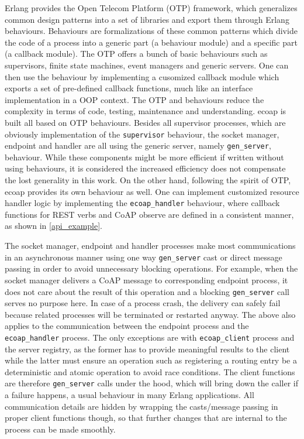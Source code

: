 Erlang provides the Open Telecom Platform (OTP) framework, which generalizes common design patterns into a set of libraries and export them through Erlang behaviours. Behaviours are formalizations of these common patterns which divide the code of a process into a generic part (a behaviour module) and a specific part (a callback module). The OTP offers a bunch of basic behaviours such as supervisors, finite state machines, event managers and generic servers. One can then use the behaviour by implementing a cusomized callback module which exports a set of pre-defined callback functions, much like an interface implementation in a OOP context. The OTP and behaviours reduce the complexity in terms of code, testing, maintenance and understanding. ecoap is built all based on OTP behaviours. Besides all supervisor processes, which are obviously implementation of the \verb|supervisor| behaviour, the socket manager, endpoint and handler are all using the generic server, namely \verb|gen_server|, behaviour. While these components might be more efficient if written without using behaviours, it is considered the increased efficiency does not compensate the lost generality in this work. On the other hand, following the spirit of OTP, ecoap provides its own behaviour as well. One can implement customized resource handler logic by implementing the \verb|ecoap_handler| behaviour, where callback functions for REST verbs and CoAP observe are defined in a consistent manner, as shown in \ref{api_example}.

The socket manager, endpoint and handler processes make most communications in an asynchronous manner using one way \verb|gen_server| cast or direct message passing in order to avoid unnecessary blocking operations. For example, when the socket manager delivers a CoAP message to corresponding endpoint process, it does not care about the result of this operation and a blocking \verb|gen_server| call serves no purpose here. In case of a process crash, the delivery can safely fail because related processes will be terminated or restarted anyway. The above also applies to the communication between the endpoint process and the \verb|ecoap_handler| process. The only exceptions are with \verb|ecoap_client| process and the server registry, as the former has to provide meaningful results to the client while the latter must ensure an operation such as registering a routing entry be a deterministic and atomic operation to avoid race conditions. The client functions are therefore \verb|gen_server| calls under the hood, which will bring down the caller if a failure happens, a usual behaviour in many Erlang applications. All communication details are hidden by wrapping the casts/message passing in proper client functions though, so that further changes that are internal to the process can be made smoothly. 

